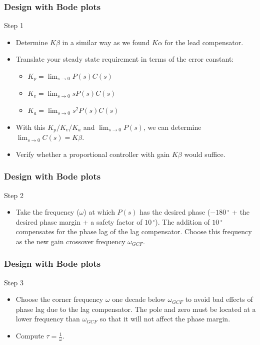 \begin{frame}
\frametitle{Design with Bode plots}
\begin{block}{Step 1}
	\begin{itemize}
	\item Determine $K\beta$ in a similar way as we found $K\alpha$ for the lead compensator.
	\item Translate your steady state requirement in terms of the error constant:
	\begin{itemize}
		\item $K_p = \lim_{s \to 0} P(s)C(s)$
		\item $K_v = \lim_{s \to 0} sP(s)C(s)$
		\item $K_a = \lim_{s \to 0} s^2P(s)C(s)$
	\end{itemize}
	\item With this $K_p/K_v/K_a$ and $\lim_{s \to 0} P(s)$, we can determine $\lim_{s \to 0}C(s) = K\beta$.
	\item Verify whether a proportional controller with gain $K\beta$ would suffice.
	\end{itemize}
\end{block}
\end{frame}

\begin{frame}
\frametitle{Design with Bode plots}
\begin{block}{Step 2}
	\begin{itemize}
	\item Take the frequency ($\omega$) at which $P(s)$ has the desired phase ($-180\,^{\circ}$ + the desired phase margin + a safety factor of $10\,^{\circ}$). The addition of $10\,^{\circ}$ compensates for the phase lag of the lag compensator. Choose this frequency as the new gain crossover frequency $\omega_{GCF}$.
	\end{itemize}
\end{block}
\end{frame}

\begin{frame}
\frametitle{Design with Bode plots}
\begin{block}{Step 3}
\begin{itemize}
\item Choose the corner frequency $\omega$ one decade below $\omega_{GCF}$ to avoid bad effects of phase lag due to the lag compensator. The pole and zero must be located at a lower frequency than $\omega_{GCF}$ so that it will not affect the phase margin.
\item Compute $\tau = \frac{1}{\omega}$.
\end{itemize}
\end{block}
\end{frame}

